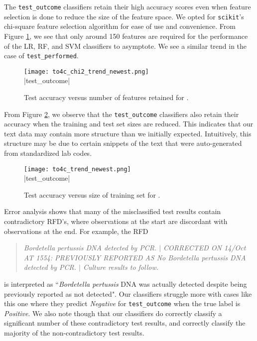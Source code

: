 \documentclass[11pt]{article}
\begin{document}
The \verb|test_outcome| classifiers retain their high accuracy scores even when feature selection is done to reduce the size of the feature space. We opted for \verb|scikit|'s chi-square feature selection algorithm for ease of use and convenience. From Figure \ref{test outcome chi2 figure}, we see that only around 150 features are required for the performance of the LR, RF, and SVM classifiers to asymptote. We see a similar trend in the case of \verb|test_performed|.
\\

\begin{figure}[H]
    \centering
    \texttt{[image: to4c\_chi2\_trend\_newest.png]} \\
    |test_outcome|
    \caption{Test accuracy versus number of features retained for \protect{}.}
    \label{test outcome chi2 figure}
\end{figure}

From Figure \ref{test outcome size figure}, we observe that the \verb|test_outcome| classifiers also retain their accuracy when the training and test set sizes are reduced. This indicates that our text data may contain more structure than we initially expected. Intuitively, this structure may be due to certain snippets of the text that were auto-generated from standardized lab codes.
\\

\begin{figure}[H]
    \centering
    \texttt{[image: to4c\_trend\_newest.png]} \\
    |test_outcome|
    \caption{Test accuracy versus size of training set for \protect{}.}
    \label{test outcome size figure}
\end{figure}

Error analysis shows that many of the misclassified test results contain contradictory RFD's, where observations at the start are discordant with observations at the end. For example, the RFD

\begin{quotation}
\noindent \textit{Bordetella pertussis DNA detected by PCR. $\vert$ CORRECTED ON 14/Oct AT 1554: PREVIOUSLY REPORTED AS No Bordetella pertussis DNA detected by PCR. $\vert$ Culture results to follow.}
\end{quotation}

\noindent is interpreted as ``\textit{Bordetella pertussis} DNA was actually detected despite being previously reported as not detected". Our classifiers struggle more with cases like this one where they predict \textit{Negative} for \verb|test_outcome| when the true label is \textit{Positive}. We also note though that our classifiers do correctly classify a significant number of these contradictory test results, and correctly classify the majority of the non-contradictory test results.
\\
\end{document}
